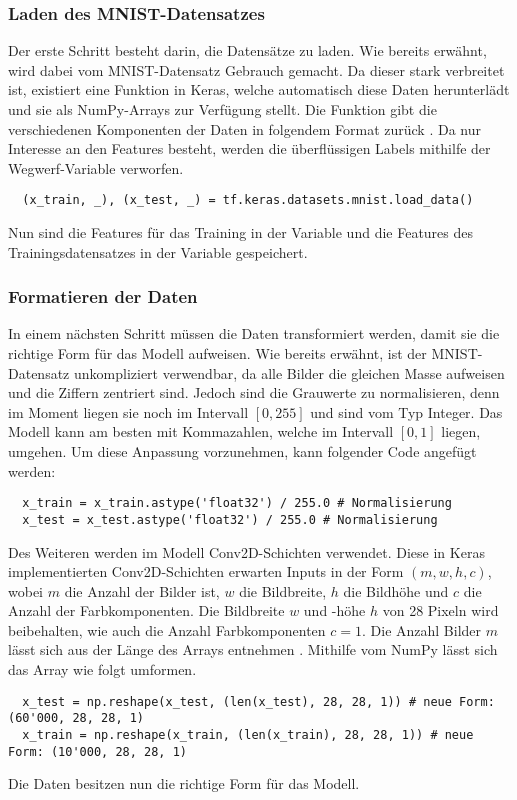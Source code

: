 \subsubsection{Laden des MNIST-Datensatzes}
Der erste Schritt besteht darin, die Datensätze zu laden. Wie bereits
erwähnt, wird dabei vom MNIST-Datensatz Gebrauch gemacht. Da dieser stark verbreitet ist,
existiert eine Funktion in Keras, welche automatisch diese Daten herunterlädt
und sie als NumPy-Arrays zur Verfügung stellt.
Die Funktion gibt die verschiedenen Komponenten der Daten in folgendem Format zurück .
Da nur Interesse an den Features  besteht, werden die überflüssigen
Labels  mithilfe der Wegwerf-Variable \code{\_} verworfen.
\begin{verbatim}
  (x_train, _), (x_test, _) = tf.keras.datasets.mnist.load_data()
\end{verbatim}
Nun sind die Features für das Training in der Variable  und die
Features des Trainingsdatensatzes in der Variable  gespeichert.

\subsubsection{Formatieren der Daten}
In einem nächsten Schritt müssen die Daten transformiert werden, damit sie die
richtige Form für das Modell aufweisen.
Wie bereits erwähnt, ist der MNIST-Datensatz unkompliziert verwendbar,
da alle Bilder die gleichen Masse aufweisen und die Ziffern zentriert sind.
\para{}
Jedoch sind die Grauwerte zu normalisieren, denn im Moment liegen sie noch im
Intervall $[0, 255]$ und sind vom Typ Integer.
Das Modell kann am besten mit Kommazahlen, welche im Intervall $[0,1]$ liegen,
umgehen. Um diese Anpassung vorzunehmen, kann folgender Code angefügt werden:
\begin{verbatim}
  x_train = x_train.astype('float32') / 255.0 # Normalisierung
  x_test = x_test.astype('float32') / 255.0 # Normalisierung
\end{verbatim}
Des Weiteren werden im Modell Conv2D-Schichten verwendet. Diese in Keras
implementierten Conv2D-Schichten erwarten Inputs in der Form $(m, w, h, c)$, wobei
$m$ die Anzahl der Bilder ist, $w$ die Bildbreite, $h$ die Bildhöhe und $c$ die
Anzahl der Farbkomponenten. Die Bildbreite $w$ und -höhe $h$ von 28 Pixeln wird beibehalten, wie auch
die Anzahl Farbkomponenten $c=1$. Die Anzahl Bilder $m$ lässt sich aus der Länge
des Arrays entnehmen . Mithilfe vom NumPy lässt sich das Array wie folgt umformen.
\begin{verbatim}
  x_test = np.reshape(x_test, (len(x_test), 28, 28, 1)) # neue Form: (60'000, 28, 28, 1)
  x_train = np.reshape(x_train, (len(x_train), 28, 28, 1)) # neue Form: (10'000, 28, 28, 1)
\end{verbatim}
Die Daten besitzen nun die richtige Form für das Modell.

